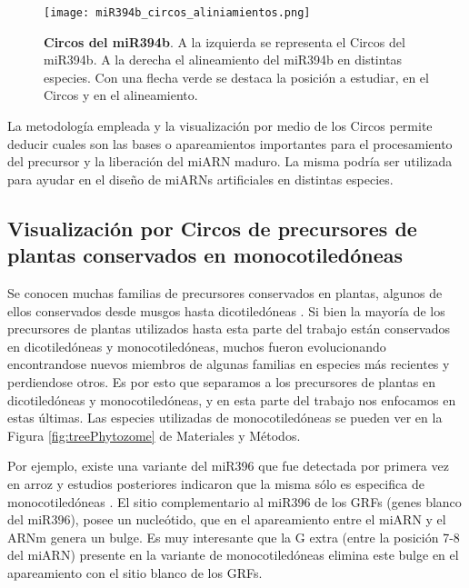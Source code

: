 \begin{figure}[htbp!] 
	\centering    
	\texttt{[image: miR394b\_circos\_aliniamientos.png]}
	\caption[Circos del miR394b]{
		\textbf{Circos del miR394b}.
		A la izquierda se representa el Circos del miR394b.
		A la derecha el alineamiento del miR394b en distintas especies. 
		Con una flecha verde se destaca la posición a estudiar, en el Circos y en el alineamiento.
	}
	\label{fig:miR394b_circos_aliniamientos}
\end{figure}

La metodología empleada y la visualización por medio de los Circos permite deducir cuales son las bases o apareamientos importantes para el procesamiento del precursor y la liberación del miARN maduro.
La misma podría ser utilizada para ayudar en el diseño de miARNs artificiales en distintas especies.


\subsection{Visualización por Circos de precursores de plantas conservados en monocotiledóneas}

Se conocen muchas familias de precursores conservados en plantas, algunos de ellos conservados desde musgos hasta dicotiledóneas \citep{pmid15849273,Axtell2008343,citeulike:8816489}.
Si bien la mayoría de los precursores de plantas utilizados hasta esta parte del trabajo están conservados en dicotiledóneas y monocotiledóneas, muchos fueron evolucionando encontrandose nuevos miembros de algunas familias en especies más recientes y perdiendose otros.    
Es por esto que separamos a los precursores de plantas en dicotiledóneas y monocotiledóneas, y en esta parte del trabajo nos enfocamos en estas últimas.
Las especies utilizadas de monocotiledóneas se pueden ver en la Figura \ref{fig:treePhytozome} de Materiales y Métodos.

Por ejemplo, existe una variante del miR396 que fue detectada por primera vez en arroz \citep{pmid15805478} y estudios posteriores indicaron que la misma sólo es especifica de monocotiledóneas \citep{pmid18416839, pmid19936050}.
El sitio complementario al miR396 de los GRFs (genes blanco del miR396), posee un nucleótido, que en el apareamiento entre el miARN y el ARNm genera un bulge.
Es muy interesante que la G extra (entre la posición 7-8 del miARN) presente en la variante de monocotiledóneas elimina este bulge en el apareamiento con el sitio blanco de los GRFs.

